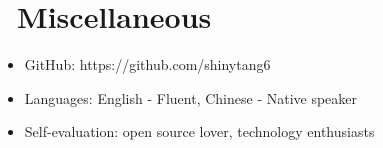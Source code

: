 \documentclass{resume}
\begin{document}
\section{\faInfo\ Miscellaneous}
\begin{itemize}[parsep=0.5ex]
  \item GitHub: https://github.com/shinytang6
  \item Languages: English - Fluent, Chinese - Native speaker
  \item Self-evaluation: open source lover, technology enthusiasts
\end{itemize}

%
%
\end{document}
